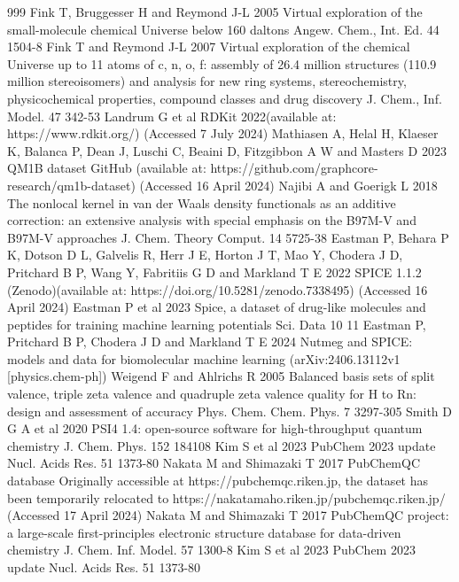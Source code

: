 \documentclass[12pt]{article}
\begin{document}
\begin{thebibliography}{999}
 Fink T, Bruggesser H and Reymond J-L 2005 Virtual exploration of the small-molecule chemical Universe below 160 daltons Angew. Chem., Int. Ed. 44 1504-8
 Fink T and Reymond J-L 2007 Virtual exploration of the chemical Universe up to 11 atoms of c, n, o, f: assembly of 26.4 million structures (110.9 million stereoisomers) and analysis for new ring systems, stereochemistry, physicochemical properties, compound classes and drug discovery J. Chem., Inf. Model. 47 342-53
 Landrum G et al RDKit 2022(available at: https://www.rdkit.org/) (Accessed 7 July 2024)
 Mathiasen A, Helal H, Klaeser K, Balanca P, Dean J, Luschi C, Beaini D, Fitzgibbon A W and Masters D 2023 QM1B dataset GitHub (available at: https://github.com/graphcore-research/qm1b-dataset) (Accessed 16 April 2024)
 Najibi A and Goerigk L 2018 The nonlocal kernel in van der Waals density functionals as an additive correction: an extensive analysis with special emphasis on the B97M-V and B97M-V approaches J. Chem. Theory Comput. 14 5725-38
 Eastman P, Behara P K, Dotson D L, Galvelis R, Herr J E, Horton J T, Mao Y, Chodera J D, Pritchard B P, Wang Y, Fabritiis G D and Markland T E 2022 SPICE 1.1.2 (Zenodo)(available at: https://doi.org/10.5281/zenodo.7338495) (Accessed 16 April 2024)
 Eastman P et al 2023 Spice, a dataset of drug-like molecules and peptides for training machine learning potentials Sci. Data 10 11
 Eastman P, Pritchard B P, Chodera J D and Markland T E 2024 Nutmeg and SPICE: models and data for biomolecular machine learning (arXiv:2406.13112v1 [physics.chem-ph])
 Weigend F and Ahlrichs R 2005 Balanced basis sets of split valence, triple zeta valence and quadruple zeta valence quality for H to Rn: design and assessment of accuracy Phys. Chem. Chem. Phys. 7 3297-305
 Smith D G A et al 2020 PSI4 1.4: open-source software for high-throughput quantum chemistry J. Chem. Phys. 152 184108
 Kim S et al 2023 PubChem 2023 update Nucl. Acids Res. 51 1373-80
 Nakata M and Shimazaki T 2017 PubChemQC database Originally accessible at https://pubchemqc.riken.jp, the dataset has been temporarily relocated to https://nakatamaho.riken.jp/pubchemqc.riken.jp/ (Accessed 17 April 2024)
 Nakata M and Shimazaki T 2017 PubChemQC project: a large-scale first-principles electronic structure database for data-driven chemistry J. Chem. Inf. Model. 57 1300-8
 Kim S et al 2023 PubChem 2023 update Nucl. Acids Res. 51 1373-80

\end{thebibliography}
\end{document}
